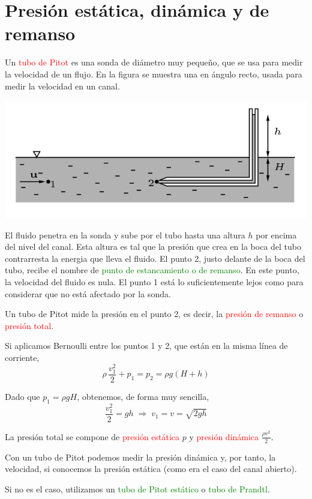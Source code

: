 \section{Presión estática, dinámica y de remanso}

	
	Un \textcolor{red}{tubo de Pitot} es una sonda de diámetro muy pequeño,
	que se usa para medir la velocidad de un flujo. En la figura se muestra
	una en ángulo recto, usada para medir la velocidad en un canal. 
	
\begin{center}
	\includegraphics[width=0.5\linewidth]{TeX_files/chapter04-Dinamica/pitot1}
\end{center}

	
	
	El fluido penetra en la sonda y sube por el tubo hasta una altura
	$h$ por encima del nivel del canal. Esta altura es tal que la presión
	que crea en la boca del tubo contrarresta la energia que lleva el
	fluido. El punto 2, justo delante de la boca del tubo, recibe el nombre
	de \textcolor{green}{punto de estancamiento o de remanso}. En este
	punto, la velocidad del fluido es nula. El punto 1 está lo suficientemente
	lejos como para considerar que no está afectado por la sonda.
	
	Un tubo de Pitot mide la presión en el punto 2, es decir, la \textcolor{red}{presión
		de remanso} o \textcolor{red}{presión total}.
	
	Si aplicamos Bernoulli entre los puntos 1 y 2, que están en la misma
	línea de corriente, 
	\[
	\rho\,\frac{v_{1}^{2}}{2}+p_{1}=p_{2}=\rho g(H+h)
	\]
	
	Dado que $p_{1}=\rho gH$, obtenemos, de forma muy sencilla, 
	\[
	\frac{v_{1}^{2}}{2}=gh\;\Rightarrow\;v_{1}=v=\sqrt{2gh}
	\]
	
La presión total se compone de \textcolor{red}{presión estática} $p$
y \textcolor{red}{presión dinámica} $\frac{\rho v^{2}}{2}$. 

Con un tubo de Pitot podemos medir la presión dinámica y, por tanto,
la velocidad, si conocemos la presión estática (como era el caso del
canal abierto). 

Si no es el caso, utilizamos un \textcolor{green}{tubo de Pitot estático}
o \textcolor{green}{tubo de Prandtl}.

